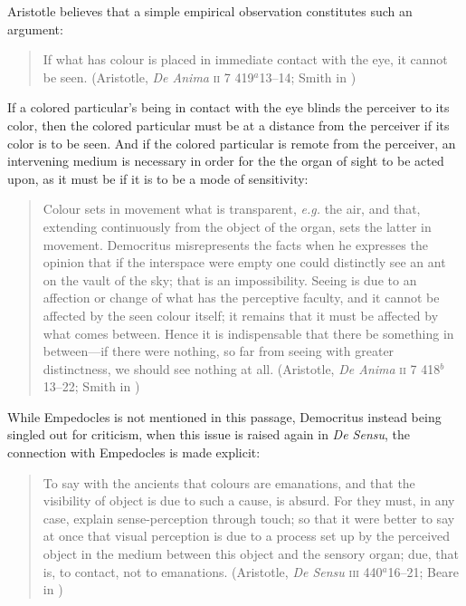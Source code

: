 Aristotle believes that a simple empirical observation constitutes such an argument:
\begin{quote}
	If what has colour is placed in immediate contact with the eye, it cannot be seen. (Aristotle, \emph{De Anima} \textsc{ii} 7 419\( ^{a} \)13--14; Smith in \citealt[]{Barnes:1984uq})
\end{quote}
If a colored particular's being in contact with the eye blinds the perceiver to its color, then the colored particular must be at a distance from the perceiver if its color is to be seen. And if the colored particular is remote from the perceiver, an intervening medium is necessary in order for the the organ of sight to be acted upon, as it must be if it is to be a mode of sensitivity:
\begin{quote}
	Colour sets in movement what is transparent, \emph{e.g.} the air, and that, extending continuously from the object of the organ, sets the latter in movement. Democritus misrepresents the facts when he expresses the opinion that if the interspace were empty one could distinctly see an ant on the vault of the sky; that is an impossibility. Seeing is due to an affection or change of what has the perceptive faculty, and it cannot be affected by the seen colour itself; it remains that it must be affected by what comes between. Hence it is indispensable that there be something in between---if there were nothing, so far from seeing with greater distinctness, we should see nothing at all. (Aristotle, \emph{De Anima} \textsc{ii} 7 418\( ^{b} \)13--22; Smith in \citealt[33--34]{Barnes:1984uq})
\end{quote}

While Empedocles is not mentioned in this passage, Democritus instead being singled out for criticism, when this issue is raised again in \emph{De Sensu}, the connection with Empedocles is made explicit:
\begin{quote}
	To say with the ancients that colours are emanations, and that the visibility of object is due to such a cause, is absurd. For they must, in any case, explain sense-perception through touch; so that it were better to say at once that visual perception is due to a process set up by the perceived object in the medium between this object and the sensory organ; due, that is, to contact, not to emanations. (Aristotle, \emph{De Sensu} \textsc{iii} 440\( ^{a} \)16--21; Beare in \citealt[9]{Barnes:1984uq})
\end{quote}

